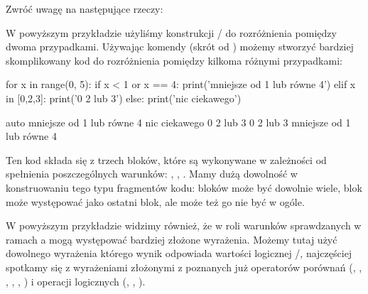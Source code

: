 \noindent Zwróć uwagę na następujące rzeczy:
W powyższym przykładzie użyliśmy konstrukcji / do rozróżnienia pomiędzy dwoma przypadkami.
Używając komendy  (skrót od ) możemy stworzyć bardziej skomplikowany kod do rozróżnienia pomiędzy kilkoma różnymi przypadkami:

\begin{CodeFrame}[python]{0.6\textwidth}
for x in range(0, 5):
    if x < 1 or x == 4:
        print('mniejsze od 1 lub równe 4')
    elif x in [0,2,3]:
        print('0 2 lub 3')
    else:
        print('nic ciekawego')
\end{CodeFrame}
\begin{CodeFrame}{auto}
mniejsze od 1 lub równe 4
nic ciekawego
0 2 lub 3
0 2 lub 3
mniejsze od 1 lub równe 4
\end{CodeFrame}

Ten kod składa się z trzech bloków, które są wykonywane w zależności od spełnienia poszczególnych warunków:
, , .
Mamy dużą dowolność w konstruowaniu tego typu fragmentów kodu: 
bloków  może być dowolnie wiele, blok  może występować jako ostatni blok,
ale może też go nie być w ogóle.

W powyższym przykładzie widzimy również, że w roli warunków sprawdzanych w ramach a mogą występować bardziej złożone wyrażenia.
Możemy tutaj użyć dowolnego wyrażenia którego wynik odpowiada wartości logicznej /,
najczęściej spotkamy się z wyrażeniami złożonymi z poznanych już operatorów porównań (\python{<}, \python{>}, \python{<=},
\python{>=}, \python{==}, \python{!=}) i operacji logicznych (, , ).

